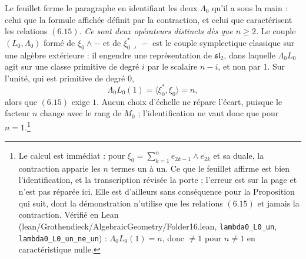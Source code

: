\documentclass[11pt,a4paper]{article}
\begin{document}
Le feuillet ferme le paragraphe en identifiant les deux $\Lambda_{0}$ qu'il a
sous la main : celui que la formule affichée définit par la contraction, et
celui que caractérisent les relations $(6.15)$. \emph{Ce sont deux opérateurs
distincts dès que $n \geqslant 2$.} Le couple $(L_{0}, \Lambda_{0})$ formé de
$\xi_{0} \wedge -$ et de $\xi^{*}_{0} \lrcorner\, -$ est le couple symplectique
classique sur une algèbre extérieure : il engendre une représentation de
$\mathfrak{sl}_{2}$, dans laquelle $\Lambda_{0}L_{0}$ agit sur une classe
primitive de degré $i$ par le scalaire $n-i$, et non par $1$. Sur l'unité, qui
est primitive de degré $0$,
\[
\Lambda_{0}L_{0}(1) = \langle \xi^{*}_{0}, \xi_{0} \rangle = n,
\]
alors que $(6.15)$ exige $1$. Aucun choix d'échelle ne répare l'écart, puisque
le facteur $n$ change avec le rang de $M_{0}$ ; l'identification ne vaut donc
que pour $n = 1$.\footnote{Le calcul est immédiat : pour
$\xi_{0} = \sum_{k=1}^{n} e_{2k-1} \wedge e_{2k}$ et sa duale, la contraction
apparie les $n$ termes un à un. Ce que le feuillet affirme est bien
l'identification, et la transcription révisée la porte ; l'erreur est sur la
page et n'est pas réparée ici. Elle est d'ailleurs sans conséquence pour la
Proposition qui suit, dont la démonstration n'utilise que les relations
$(6.15)$ et jamais la contraction. Vérifié en Lean
(lean/Grothendieck/AlgebraicGeometry/Folder16.lean, \texttt{lambda0\_L0\_un},
\texttt{lambda0\_L0\_un\_ne\_un}) : $\Lambda_{0}L_{0}(1) = n$, donc
$\neq 1$ pour $n \neq 1$ en caractéristique nulle.}
\end{document}
